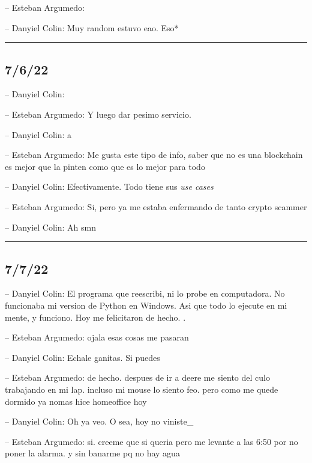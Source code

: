 -- Esteban Argumedo:

-- Danyiel Colin: Muy random estuvo eao. Eso*

\begin{center}\rule{0.5\linewidth}{0.5pt}\end{center}

\hypertarget{section-118}{%
\subsection{7/6/22}\label{section-118}}

-- Danyiel Colin:

-- Esteban Argumedo: Y luego dar pesimo servicio.

-- Danyiel Colin: a

-- Esteban Argumedo: Me gusta este tipo de info, saber que no es una
blockchain es mejor que la pinten como que es lo mejor para todo

-- Danyiel Colin: Efectivamente. Todo tiene sus \emph{use cases}

-- Esteban Argumedo: Si, pero ya me estaba enfermando de tanto crypto
scammer

-- Danyiel Colin: Ah smn

\begin{center}\rule{0.5\linewidth}{0.5pt}\end{center}

\hypertarget{section-119}{%
\subsection{7/7/22}\label{section-119}}

-- Danyiel Colin: El programa que reescribi, ni lo probe en computadora.
No funcionaba mi version de Python en Windows. Asi que todo lo ejecute
en mi mente, y funciono. Hoy me felicitaron de hecho. .

-- Esteban Argumedo: ojala esas cosas me pasaran

-- Danyiel Colin: Echale ganitas. Si puedes

-- Esteban Argumedo: de hecho. despues de ir a deere me siento del culo
trabajando en mi lap. incluso mi mouse lo siento feo. pero como me quede
dormido ya nomas hice homeoffice hoy

-- Danyiel Colin: Oh ya veo. O sea, hoy no viniste\_

-- Esteban Argumedo: si. creeme que si queria pero me levante a las 6:50
por no poner la alarma. y sin banarme pq no hay agua

